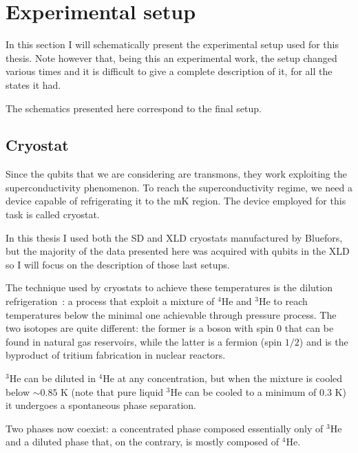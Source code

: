 \section{Experimental setup}

In this section I will schematically present the experimental setup used for this thesis.
Note however that, being this an experimental work, the setup changed various times and it is difficult to give a complete description of it, for all the states it had.

The schematics presented here correspond to the final setup.

\subsection{Cryostat}

Since the qubits that we are considering are transmons, they work exploiting the superconductivity phenomenon.
To reach the superconductivity regime, we need a device capable of refrigerating it to the mK region.
The device employed for this task is called cryostat.

In this thesis I used both the SD and XLD cryostats manufactured by Bluefors, but the majority of the data presented here was acquired with qubits in the XLD so I will focus on the description of those last setups.

The technique used by cryostats to achieve these temperatures is the dilution refrigeration~\cite{McClintock2003, Craig2004}: a process that exploit a mixture of $^4\mathrm{He}$ and $^3\mathrm{He}$ to reach temperatures below the minimal one achievable through pressure process.
The two isotopes are quite different: the former is a boson with spin $0$ that can be found in natural gas reservoirs, while the latter is a fermion (spin $1/2$) and is the byproduct of tritium fabrication in nuclear reactors.

$\mathrm{^3He}$ can be diluted in $\mathrm{^4He}$ at any concentration, but when the mixture is cooled below $\sim 0.85$ K (note that pure liquid $\mathrm{^3He}$ can be cooled to a minimum of $0.3$ K) it undergoes a spontaneous phase separation.

Two phases now coexist: a concentrated phase composed essentially only of $\mathrm{^3He}$ and a diluted phase that, on the contrary, is mostly composed of $\mathrm{^4He}$.

